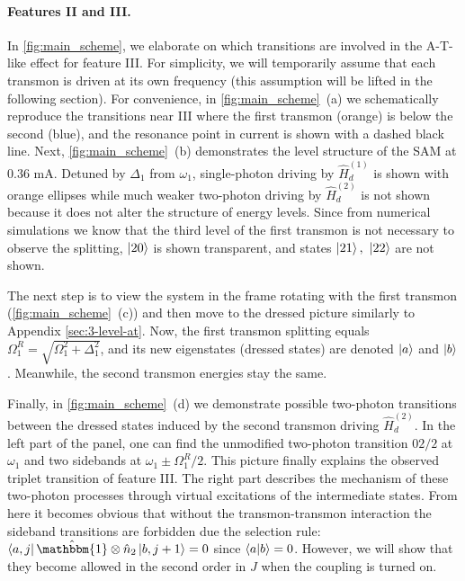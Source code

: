 \documentclass[%
 aps, prx,
 amsmath,amssymb,
 reprint,%
superscriptaddress
]{revtex4-2}
\begin{document}
\paragraph{Features II and III.}  

In \autoref{fig:main_scheme}, we elaborate on which transitions
are involved in the A-T-like effect for feature III. 
For simplicity, we will temporarily assume that 
each transmon is driven at its own frequency 
(this assumption will be lifted in the following 
section). For convenience, in 
\autoref{fig:main_scheme}~(a) we schematically 
reproduce the transitions near III where the 
first transmon (orange) is below the second 
(blue), and the resonance point in current is 
shown with a dashed black line. Next, 
\autoref{fig:main_scheme}~(b) demonstrates the 
level structure of the SAM at 0.36 mA. Detuned by 
$\Delta_1$ from $\omega_1$, single-photon driving by 
$\hat H_d^{(1)}$ is shown with orange ellipses while 
much weaker two-photon driving by $\hat H_d^{(2)}$ is not shown because it does not alter the structure of energy levels. Since from numerical simulations we know 
that the third level of the first transmon is not 
necessary to observe the splitting, $\ket{20}$ is 
shown transparent, and states $\ket{21},\ 
\ket{22}$ are not shown.

The next step is to view the system in the frame 
rotating with the first transmon 
(\autoref{fig:main_scheme}~(c)) and then move to 
the  dressed picture similarly to Appendix 
\ref{sec:3-level-at}. Now, the first transmon 
splitting equals $\Omega_{1}^R = 
\sqrt{\Omega_1^2+\Delta_1^2}$, and its new 
eigenstates (dressed states) are denoted 
$\ket{a}$ and $\ket{b}$. Meanwhile, the second 
transmon energies stay the same.


Finally, in \autoref{fig:main_scheme}~(d) we demonstrate possible two-photon transitions between the dressed states induced by the second transmon driving $\hat H_{d}^{(2)}$. In the left part of the panel, one can find the unmodified two-photon transition $02/2$ at $\omega_1$ and two sidebands at $\omega_1 \pm \Omega_1^R/2$. This picture finally explains the observed triplet transition of feature III. The right part describes the mechanism of these two-photon processes through virtual excitations of the intermediate states. From here it becomes obvious that without the transmon-transmon interaction the sideband transitions are forbidden due the selection rule: $\bra{a,j}\hat{\mathbbm{1}}\otimes \hat n_2 \ket{b, j+1} = 0$ since $\braket{a}{b} = 0$. However, we will show that they become allowed in the second order in $J$ when the coupling is turned on.
\end{document}

